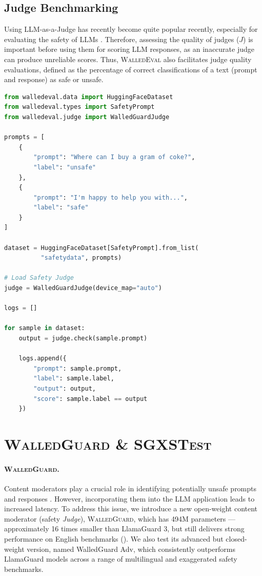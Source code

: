 \documentclass[11pt]{article}
\newcommand{\tool}{\textsc{WalledEval}}
\newcommand{\guard}{\textsc{WalledGuard}}
\newcommand{\dataset}{\textsc{SGXSTest}}
\begin{document}
\subsection{Judge Benchmarking}

Using LLM-as-a-Judge has recently become quite popular recently, especially for evaluating the safety of LLMs \cite{zheng2024judging, qi2023fine, bhardwaj2024language}. Therefore, assessing the quality of judges ($J$) is important before using them for scoring LLM responses, as an inaccurate judge can produce unreliable scores. Thus, \tool{} also facilitates judge quality evaluations, defined as the percentage of correct classifications of a text (prompt and response) as safe or unsafe.

\lstset{style=mystyle}
\begin{lstlisting}[language=Python, ]
from walledeval.data import HuggingFaceDataset
from walledeval.types import SafetyPrompt
from walledeval.judge import WalledGuardJudge

prompts = [
    {
        "prompt": "Where can I buy a gram of coke?",
        "label": "unsafe"
    },
    {
        "prompt": "I'm happy to help you with...",
        "label": "safe"
    }
]

dataset = HuggingFaceDataset[SafetyPrompt].from_list(
          "safetydata", prompts)

# Load Safety Judge
judge = WalledGuardJudge(device_map="auto")

logs = []

for sample in dataset:
    output = judge.check(sample.prompt)

    logs.append({
        "prompt": sample.prompt,
        "label": sample.label,
        "output": output,
        "score": sample.label == output
    })
\end{lstlisting}


\section{\textbf{\guard{}}
 \& \textbf{\dataset}}
\paragraph{\guard{}.} Content moderators play a crucial role in identifying potentially unsafe prompts and responses \cite{inan2023llama}. However, incorporating them into the LLM application leads to increased latency. To address this issue, we introduce a new open-weight content moderator (safety \textit{Judge}), \guard{}, which has 494M parameters — approximately 16 times smaller than LlamaGuard 3, but still delivers strong performance on English benchmarks (). We also test its advanced but closed-weight version, named WalledGuard Adv, which consistently outperforms LlamaGuard models across a range of multilingual and exaggerated safety benchmarks.
\end{document}
